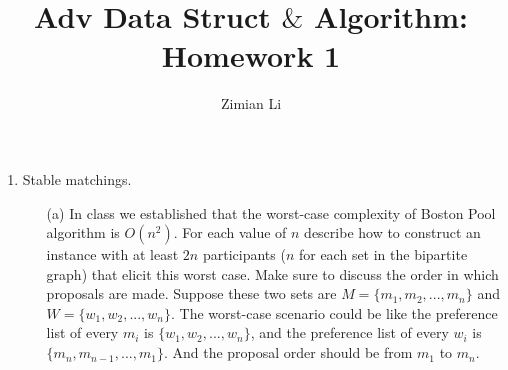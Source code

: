 \documentclass{article}       %
\title{Adv Data Struct $\&$ Algorithm: Homework 1}
\author{Zimian Li}
\begin{document}
        
\maketitle

\begin{enumerate}
        \item Stable matchings.\newline
        \begin{enumerate}
                \item[(a)] In class we established that the worst-case complexity of Boston Pool algorithm is $O(n^2)$. For each value of $n$ describe how to construct an instance with at least $2n$ participants ($n$ for each set in the bipartite graph) that elicit this worst case. Make sure to discuss the order in which proposals are made.\newline\newline
                Suppose these two sets are $M = \{m_1, m_2, ..., m_n\}$ and $W = \{w_1, w_2, ..., w_n\}$.\newline
                The worst-case scenario could be like the preference list of every $m_i$ is $\{w_1, w_2, ..., w_n\}$, and the preference list of every $w_i$ is $\{m_n, m_{n-1}, ..., m_1\}$. And the proposal order should be from $m_1$ to $m_n$.\newline 
                

\end{enumerate}
\end{enumerate}
\end{document}
